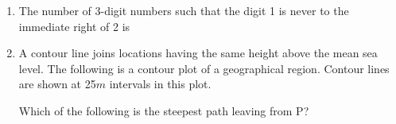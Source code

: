 \documentclass[journal,12pt,onecolumn]{IEEEtran}
\theoremstyle{remark}
\begin{document}
\begin{enumerate}
\begin{enumerate}
\end{enumerate}
\item The number of 3-digit numbers such that the digit 1 is never to the immediate right of 2 is
\begin{enumerate}
\end{enumerate}
\item A contour line joins locations having the same height above the mean sea level. The following is a contour plot of a geographical region. Contour lines are shown at 25$m$ intervals in this plot.
\begin{figure}[H]
    \centering
    
 \end{figure}
 Which of the following is the steepest path leaving from P?
\begin{enumerate}
\end{enumerate}
\end{enumerate}
\end{document}
